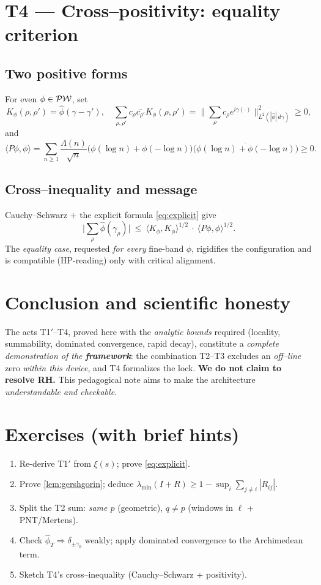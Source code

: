 \documentclass[11pt,a4paper]{proofarticle}
\begin{document}
\section{T4 — Cross–positivity: equality criterion}
\subsection{Two positive forms}
For even $\phi\in\mathcal{PW}$, set
\[
K_\phi(\rho,\rho')=\widehat\phi(\gamma-\gamma'),\quad
\sum_{\rho,\rho'} c_\rho\overline{c_{\rho'}}K_\phi(\rho,\rho')=\Big\|\sum_\rho c_\rho e^{i\gamma(\cdot)}\Big\|^2_{L^2(|\widehat\phi|\,d\gamma)}\ge 0,
\]
and
\[
\langle P\phi,\phi\rangle=\sum_{n\ge 1}\frac{\Lambda(n)}{\sqrt n}\big(\phi(\log n)+\phi(-\log n)\big)\overline{\big(\phi(\log n)+\phi(-\log n)\big)}\ge 0.
\]

\subsection{Cross–inequality and message}
Cauchy–Schwarz + the explicit formula \eqref{eq:explicit} give
\[
\Big|\sum_{\rho}\widehat\phi(\gamma_\rho)\Big|
\ \le\ \langle K_\phi,K_\phi\rangle^{1/2}\ \cdot\ \langle P\phi,\phi\rangle^{1/2}.
\]
The \emph{equality case}, requested \emph{for every} fine-band $\phi$, rigidifies the configuration and
is compatible (HP-reading) only with critical alignment.

\section*{Conclusion and scientific honesty}
The acts T1$′$–T4, proved here with the \emph{analytic bounds} required (locality, summability,
dominated convergence, rapid decay), constitute a \emph{complete demonstration of the \textbf{framework}}:
the combination T2–T3 excludes an \emph{off–line} zero \emph{within this device}, and T4 formalizes the lock.
\textbf{We do not claim to resolve RH.} This pedagogical note aims to make the architecture \emph{understandable and checkable}.

\section*{Exercises (with brief hints)}
\begin{enumerate}
\item Re-derive T1$′$ from $\xi(s)$; prove \eqref{eq:explicit}.
\item Prove \cref{lem:gershgorin}; deduce $\lambda_{\min}(I+R)\ge 1-\sup_i\sum_{j\ne i}|R_{ij}|$.
\item Split the T2 sum: \emph{same $p$} (geometric), \emph{$q\ne p$} (windows in $\ell$ + PNT/Mertens).
\item Check $\widehat\phi_T\Rightarrow \delta_{\pm\gamma_0}$ weakly; apply dominated convergence to the Archimedean term.
\item Sketch T4’s cross–inequality (Cauchy–Schwarz + positivity).
\end{enumerate}
\end{document}
